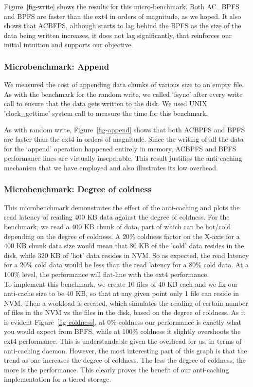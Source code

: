 Figure~\ref{fig-write} shows the results for this micro-benchmark. Both AC\_BPFS and BPFS are faster than the ext4 in orders of magnitude, as we hoped. It also shows that AC\-BFPS, although starts to lag behind the BPFS as the size of the data being written increases, it does not lag significantly, that reinforces our initial intuition and supports our objective.



\subsubsection{Microbenchmark: Append}
We measured the cost of appending data chunks of various size to an empty file. As with the benchmark for the random write, we called ‘fsync’ after every write call to ensure that the data gets written to the disk. We used UNIX 'clock\_gettime' system call to measure the time for this benchmark.

As with random write, Figure~\ref{fig-append}  shows that both AC\-BPFS and BPFS are faster than the ext4 in orders of magnitude. Since the writing of all the data for the ‘append’ operation happened entirely in memory, AC\-BPFS and BPFS performance lines are virtually inseparable. This result justifies the anti-caching mechanism that we have employed and also illustrates its low overhead.


\subsubsection{Microbenchmark: Degree of coldness}
This microbenchmark demonstrates the effect of the anti-caching and plots the read latency of reading 400 KB data against the degree of coldness. For the benchmark, we read a 400 KB chunk of data, part of which can be hot/cold depending on the degree of coldness. A 20\% coldness factor on the X-axis for a 400 KB chunk data size would mean that 80 KB of the 'cold' data resides in the disk, while 320 KB of 'hot' data resides in NVM. So as expected, the read latency for a 20\% cold data would be less than the read latency for a 80\% cold data. At a 100\% level, the performance will flat-line with the ext4 performance. \\
To implement this benchmark, we create 10 files of 40 KB each and we fix our anti-cache size to be 40 KB, so that at any given point only 1 file can reside in NVM. Then a workload is created, which simulates the reading of certain number of files in the NVM vs the files in the disk, based on the degree of coldness. 
As it is evident Figure~\ref{fig-coldness}, at 0\% coldness our performance is exactly what you would expect from BPFS, while at 100\% coldness it slightly overshoots the ext4 performance. This is understandable given the overhead for us, in terms of anti-caching daemon. However, the most interesting part of this graph is that the trend as one increases the degree of coldness. The less the degree of coldness, the more is the performance. This clearly proves the benefit of our anti-caching implementation for a tiered storage.


